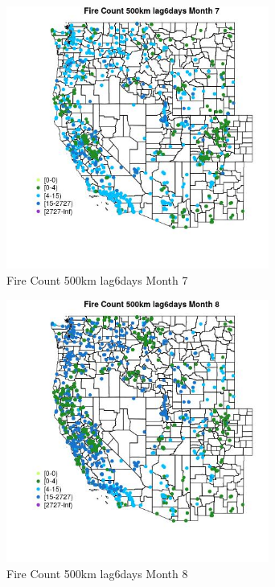 \begin{figure} 
\centering  
\includegraphics[width=0.77\textwidth]{Code_Outputs/Report_ML_input_PM25_Step4_part_f_de_duplicated_aves_prioritize_24hr_obswNAs_MapObsMo7Fire_Count_500km_lag6days.jpg} 
\caption{\label{fig:Report_ML_input_PM25_Step4_part_f_de_duplicated_aves_prioritize_24hr_obswNAsMapObsMo7Fire_Count_500km_lag6days}Fire Count 500km lag6days Month 7} 
\end{figure} 
 

\begin{figure} 
\centering  
\includegraphics[width=0.77\textwidth]{Code_Outputs/Report_ML_input_PM25_Step4_part_f_de_duplicated_aves_prioritize_24hr_obswNAs_MapObsMo8Fire_Count_500km_lag6days.jpg} 
\caption{\label{fig:Report_ML_input_PM25_Step4_part_f_de_duplicated_aves_prioritize_24hr_obswNAsMapObsMo8Fire_Count_500km_lag6days}Fire Count 500km lag6days Month 8} 
\end{figure} 
 

